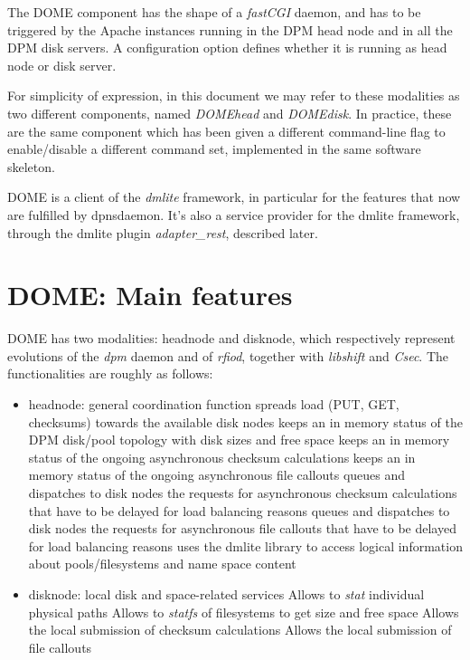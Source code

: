\documentclass[a4paper,10pt]{scrreprt}
\begin{document}
The DOME component has the shape of a \textit{fastCGI} daemon, and has to be triggered by the Apache instances running in the DPM head node and
in all the DPM disk servers. A configuration option defines whether it is running as head node or disk server.

For simplicity of expression, in this document we may refer to these modalities as two different components, named \textit{DOMEhead} and \textit{DOMEdisk}.
In practice, these are the same component which has been given a different command-line flag to enable/disable a different command set,
implemented in the same software skeleton.

DOME is a client of the \textit{dmlite} framework, in particular for the features that now are fulfilled by dpnsdaemon. It's also a
service provider for the dmlite framework, through the dmlite plugin \textit{adapter\_rest}, described later.

\section{DOME: Main features}
DOME has two modalities: headnode and disknode, which respectively represent evolutions of the \textit{dpm} daemon and of \textit{rfiod}, together with \textit{libshift} and \textit{Csec}.
The functionalities are roughly as follows:
\begin{itemize}
 \item headnode: general coordination function
 \subitem spreads load (PUT, GET, checksums) towards the available disk nodes
 \subitem keeps an in memory status of the DPM disk/pool topology with disk sizes and free space
 \subitem keeps an in memory status of the ongoing asynchronous checksum calculations
 \subitem keeps an in memory status of the ongoing asynchronous file callouts
 \subitem queues and dispatches to disk nodes the requests for asynchronous checksum calculations that have to be delayed for load balancing reasons
 \subitem queues and dispatches to disk nodes the requests for asynchronous file callouts that have to be delayed for load balancing reasons
 \subitem uses the dmlite library to access logical information about pools/filesystems and name space content

 \item disknode: local disk and space-related services
 \subitem Allows to \textit{stat} individual physical paths
 \subitem Allows to \textit{statfs} of filesystems to get size and free space
 \subitem Allows the local submission of checksum calculations
 \subitem Allows the local submission of file callouts
\end{itemize}
\end{document}
